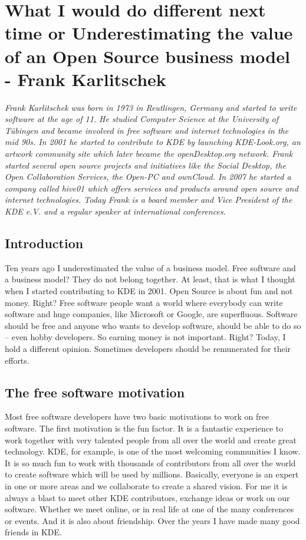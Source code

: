 \chapter{What I would do different next time or Underestimating the value of an
Open Source business model - Frank Karlitschek}

\textit{Frank Karlitschek was born in 1973 in Reutlingen, Germany and started to
write software at the age of 11. He studied Computer Science at the University
of T\"ubingen and became involved in free software and internet technologies in
the mid 90s. In 2001 he started to contribute to KDE by launching KDE-Look.org,
an artwork community site which later became the openDesktop.org network. Frank
started several open source projects and initiatives like the Social Desktop,
the Open Collaboration Services, the Open-PC and ownCloud. In 2007 he started a
company called hive01 which offers services and products around open source and
internet technologies.
Today Frank is a board member and Vice President of the KDE e.V. and a regular
speaker at international conferences.}

\section*{Introduction}

Ten years ago I underestimated the value of a business model. Free software and
a business model? They do not belong together. At least, that is what I thought
when I started contributing to KDE in 2001. Open Source is about fun and not
money. Right? Free software people want a world where everybody can write
software and huge companies, like Microsoft or Google, are superfluous. Software
should be free and anyone who wants to develop software, should be able to do so
-- even hobby developers. So earning money is not important. Right? Today, I
hold a different opinion. Sometimes developers should be remunerated for their
efforts.  

\section*{The free software motivation}

Most free software developers have two basic motivations to work on free
software. The first motivation is the fun factor. It is a fantastic experience
to work together with very talented people from all over the world and create
great technology. KDE, for example, is one of the most welcoming communities I
know. It is so much fun to work with thousands of contributors from all over the
world to create software which will be used by millions. Basically, everyone is
an expert in one or more areas and we collaborate to create a shared vision. For
me it is always a blast to meet other KDE contributors, exchange ideas or work
on our software. Whether we meet online, or in real life at one of the many
conferences or events. And it is also about friendship. Over the years I have
made many good friends in KDE.

